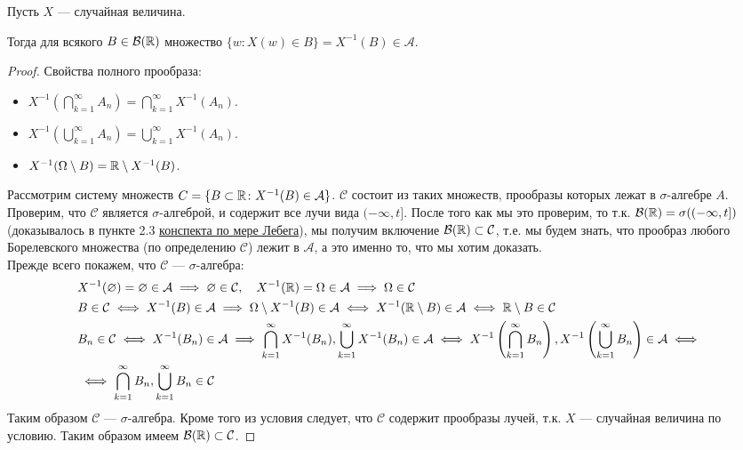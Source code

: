 Пусть $X$ --- случайная величина.
\label{random_val_for_Borelian}
\begin{proposal}
    Тогда для всякого $B \in \mathcal{B}(\mathbb{R})$ множество
    $\{w \colon X(w) \in B\} = X^{-1}(B) \in \mathcal{A}$.
\end{proposal}
\begin{proof}
    Свойства полного прообраза:
    \begin{itemize}
        \item $X^{-1}\left( \bigcap_{k=1}^{\infty} A_n \right) = \bigcap_{k=1}^{\infty} X^{-1}(A_n)$.
        \item $X^{-1}\left( \bigcup_{k=1}^{\infty} A_n \right) = \bigcup_{k=1}^{\infty} X^{-1}(A_n)$.
        \item $X^{-1} (\Omega \setminus B) = \mathbb{R} \setminus X^{-1} (B)$.
    \end{itemize}
    Рассмотрим систему множеств $C = \{B \subset \mathbb{R} \colon X^{-1}(B) \in \mathcal{A}\}$. $\mathcal{C}$ состоит из таких
    множеств, прообразы которых лежат в $\sigma$-алгебре $A$. Проверим, что $\mathcal{C}$ является $\sigma$-алгеброй, и
    содержит все лучи вида $(-\infty, t]$. После того как мы это проверим, то т.к.
    $\mathcal{B}(\mathbb{R}) = \sigma((-\infty, t])$ (доказывалось в пункте 2.3 \href{https://raw.githubusercontent.com/johanDDC/My_TeXs/5981fbe92fbd8dfae37ea2c29fbf204a942d0d09/pdf/Lebeg/Lebeg.pdf}{конспекта по мере Лебега}),
    мы получим включение $\mathcal{B}(\mathbb{R}) \subset \mathcal{C}$, т.е. мы будем знать,
    что прообраз любого Борелевского множества (по определению $\mathcal{C}$) лежит в $\mathcal{A}$, а это именно то,
    что мы хотим доказать.\\
    Прежде всего покажем, что $\mathcal{C}$ --- $\sigma$-алгебра:
    \begin{align*}
        &X^{-1}(\varnothing) = \varnothing \in \mathcal{A} \implies \varnothing \in \mathcal{C}, ~~~
        X^{-1}(\mathbb{R}) = \Omega \in \mathcal{A} \implies \Omega \in \mathcal{C}\\
        &B \in \mathcal{C} \iff X^{-1}(B) \in \mathcal{A} \implies \Omega \setminus X^{-1}(B) \in \mathcal{A}
        \iff X^{-1}(\mathbb{R} \setminus B) \in \mathcal{A} \iff \mathbb{R} \setminus B \in \mathcal{C}\\
        &B_n \in \mathcal{C} \iff X^{-1}(B_n) \in \mathcal{A} \implies \bigcap_{k=1}^{\infty} X^{-1}(B_n),
        \bigcup_{k=1}^{\infty} X^{-1}(B_n) \in \mathcal{A} \iff X^{-1}\left( \bigcap_{k=1}^{\infty} B_n \right),
        X^{-1}\left( \bigcup_{k=1}^{\infty} B_n \right) \in \mathcal{A} \iff\\
        &\iff \bigcap_{k=1}^{\infty} B_n, \bigcup_{k=1}^{\infty} B_n \in \mathcal{C}
    \end{align*}
    Таким образом $\mathcal{C}$ --- $\sigma$-алгебра. Кроме того из условия следует, что $\mathcal{C}$ содержит прообразы
    лучей, т.к. $X$ --- случайная величина по условию. Таким образом имеем $\mathcal{B}(\mathbb{R}) \subset \mathcal{C}$.
\end{proof}
